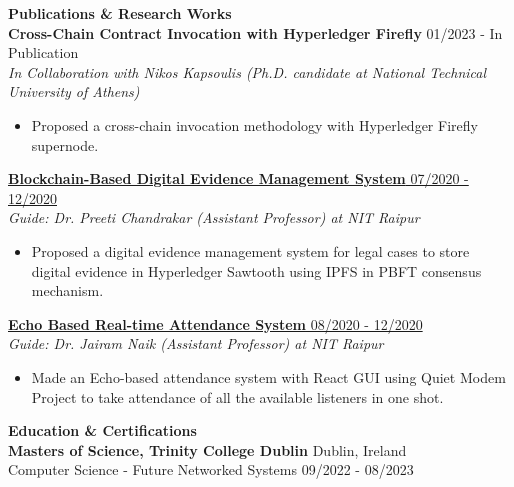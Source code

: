 \documentclass{article}
\begin{document}
\noindent \large \textbf{\textcolor{NavyBlue}{Publications \& Research Works}} \vspace{3pt} \\
\noindent \normalsize \textbf{Cross-Chain Contract Invocation with Hyperledger Firefly} \hfill 01/2023 - In Publication \\
\textit{In Collaboration with Nikos Kapsoulis (Ph.D. candidate at National Technical University of Athens)} \hfill
\begin{itemize}
    \item Proposed a cross-chain invocation methodology with Hyperledger Firefly supernode.
\end{itemize}
\noindent \normalsize \href{https://link.springer.com/content/pdf/10.1007/978-3-030-82469-3_30}{\textbf{Blockchain-Based Digital Evidence Management System } \hfill 07/2020 - 12/2020} \\
\textit{Guide: Dr. Preeti Chandrakar (Assistant Professor) at NIT Raipur} \hfill
\begin{itemize}
    \item Proposed a digital evidence management system for legal cases to store digital evidence in Hyperledger Sawtooth using IPFS in PBFT consensus mechanism.
\end{itemize}

\noindent \normalsize \href{https://dx.doi.org/10.1504/ijiids.2022.10044370}{\textbf{Echo Based Real-time Attendance System} \hfill 08/2020 - 12/2020} \\
\textit{Guide: Dr. Jairam Naik (Assistant Professor) at NIT Raipur}
\begin{itemize}
    \item  Made an Echo-based attendance system with React GUI using Quiet Modem Project to take attendance of all the available listeners in one shot.
\end{itemize}
\noindent \large \textbf{\textcolor{NavyBlue}{Education \& Certifications}} \vspace{3pt} \\
\normalsize \textbf{Masters of Science, Trinity College Dublin} \hfill Dublin, Ireland\\
Computer Science - Future Networked Systems \hfill 09/2022 - 08/2023
\vspace{3pt}
\end{document}

